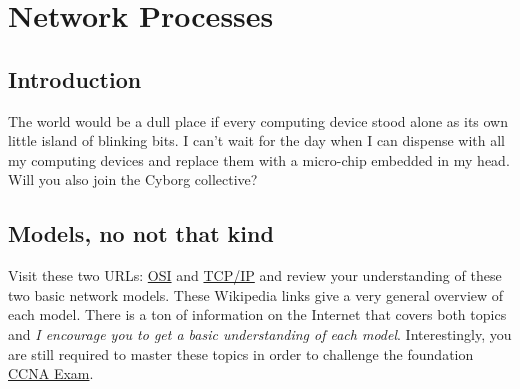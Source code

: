 \chapter{Network Processes}
\label{ch:networkprocesses}
\pagestyle{fancy}

\fancyhf{} %
\fancyhead[OC]{\leftmark} %
\fancyhead[EC]{\rightmark} %
\setlength{\headheight}{13.6pt} 
\cfoot{\thepage} %
		
\section{Introduction}

The world would be a dull place if every computing device stood alone as its own little island of blinking bits. I can't wait for the day when I can dispense with all my computing devices and replace them with a micro-chip embedded in my head. Will you also join the Cyborg collective?

\section{Models, no not that kind}

Visit these two URLs: \href{https://en.wikipedia.org/wiki/OSI\_model}{OSI} and \href{https://en.wikipedia.org/wiki/Internet_protocol_suite}{TCP/IP} and review your understanding of these two basic network models. These Wikipedia links give a very general overview of each model. There is a ton of information on the Internet that covers both topics and \textit{I encourage you to get a basic understanding of each model}. Interestingly, you are still required to master these topics in order to challenge the foundation \href{https://learningnetwork.cisco.com/community/certifications/ccna/ccna_exam_v2/exam-topics}{CCNA Exam}.\\

